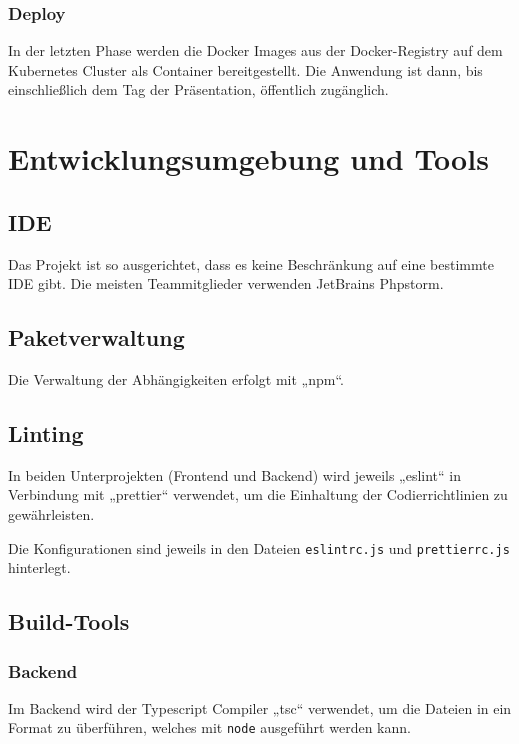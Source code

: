 \documentclass[letterpaper, 10 pt, conference]{ieeeconf}
\begin{document}
\subsubsection{Deploy}

In der letzten Phase werden die Docker Images aus der Docker-Registry auf dem Kubernetes Cluster als Container bereitgestellt. Die Anwendung ist dann,  bis einschließlich dem Tag der Präsentation, öffentlich zugänglich.


\section{Entwicklungsumgebung und Tools}

\subsection{IDE}

Das Projekt ist so ausgerichtet, dass es keine Beschränkung auf eine bestimmte IDE gibt.
Die meisten Teammitglieder verwenden JetBrains Phpstorm.

\subsection{Paketverwaltung}

Die Verwaltung der Abhängigkeiten erfolgt mit „npm“.

\subsection{Linting}

In beiden Unterprojekten (Frontend und Backend) wird jeweils „eslint“ in Verbindung mit „prettier“ verwendet,
um die Einhaltung der Codierrichtlinien zu gewährleisten.

Die Konfigurationen sind jeweils in den Dateien \texttt{eslintrc.js} und \texttt{prettierrc.js} hinterlegt.

\subsection{Build-Tools}

\subsubsection{Backend}

Im Backend wird der Typescript Compiler „tsc“ verwendet, um die Dateien in ein Format zu überführen,
welches mit \texttt{node} ausgeführt werden kann.
\end{document}
